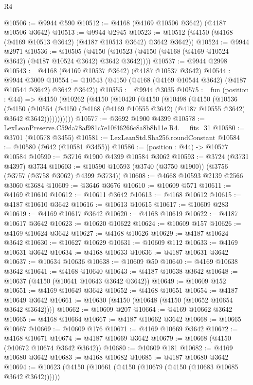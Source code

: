 \begin{lexlean}{R4}
\begin{coremodule}
@10506 := @9944 @590
@10512 := @4168 (@4169 @10506 @3642) (@4187 @10506 @3642)
@10513 := @9944 @2945
@10523 := @10512 (@4150 (@4168 (@4169 @10513 @3642) (@4187 @10513 @3642) @3642 @3642))
@10524 := @9944 @2971
@10536 := @10505
    (@4150 (@10523 (@4150 (@4168 (@4169 @10524 @3642) (@4187 @10524 @3642) @3642 @3642))))
@10537 := @9944 @2998
@10543 := @4168 (@4169 @10537 @3642) (@4187 @10537 @3642)
@10544 := @9944 @3009
@10554 := @10543 (@4150 (@4168 (@4169 @10544 @3642) (@4187 @10544 @3642) @3642 @3642))
@10555 := @9944 @3035
@10575 := fun (position : @44) =>
  @4150
    (@10262
      (@4150
        (@10420
          (@4150
            (@10498
              (@4150
                (@10536
                  (@4150
                    (@10554
                      (@4150 (@4168 (@4169 @10555 @3642) (@4187 @10555 @3642) @3642 @3642)))))))))))
@10577 := @3692 @1900 @4399
@10578 := LexLeanPreserve.C59da78af981c7e10f46266c8a8b8b11e.R4.__fits_31
@10580 := @3701 (@10578 @3455)
@10581 := LexLeanStd.Sha256.roundConstant
@10584 := @10580 (@642 (@10581 @3455))
@10586 := (position : @44) -> @10577 @10584
@10590 := @3716 @1900 @4399 @10584 @3062
@10593 := @3724 (@3731 @4397) @3734
@10603 := @10590 @10593 (@3740 (@3750 @1900)) (@3756 (@3757 (@3758 @3062) @4399 @3734))
@10608 := @4668 @10593 @2139 @2566 @3060 @3684
@10609 := @3646 @3676
@10610 := @10609 @571
@10611 := @4169 @10610
@10612 := @10611 @3642
@10613 := @4168 @10612
@10615 := @4187 @10610 @3642
@10616 := @10613 @10615
@10617 := @10609 @283
@10619 := @4169 @10617 @3642
@10620 := @4168 @10619
@10622 := @4187 @10617 @3642
@10623 := @10620 @10622
@10624 := @10609 @157
@10626 := @4169 @10624 @3642
@10627 := @4168 @10626
@10629 := @4187 @10624 @3642
@10630 := @10627 @10629
@10631 := @10609 @112
@10633 := @4169 @10631 @3642
@10634 := @4168 @10633
@10636 := @4187 @10631 @3642
@10637 := @10634 @10636
@10638 := @10609 @50
@10640 := @4169 @10638 @3642
@10641 := @4168 @10640
@10643 := @4187 @10638 @3642
@10648 := @10637 (@4150 (@10641 @10643 @3642 @3642))
@10649 := @10609 @152
@10651 := @4169 @10649 @3642
@10652 := @4168 @10651
@10654 := @4187 @10649 @3642
@10661 := @10630 (@4150 (@10648 (@4150 (@10652 @10654 @3642 @3642))))
@10662 := @10609 @207
@10664 := @4169 @10662 @3642
@10665 := @4168 @10664
@10667 := @4187 @10662 @3642
@10668 := @10665 @10667
@10669 := @10609 @176
@10671 := @4169 @10669 @3642
@10672 := @4168 @10671
@10674 := @4187 @10669 @3642
@10679 := @10668 (@4150 (@10672 @10674 @3642 @3642))
@10680 := @10609 @181
@10682 := @4169 @10680 @3642
@10683 := @4168 @10682
@10685 := @4187 @10680 @3642
@10694 := @10623 (@4150 (@10661 (@4150 (@10679 (@4150 (@10683 @10685 @3642 @3642))))))

\end{coremodule}
\end{lexlean}
